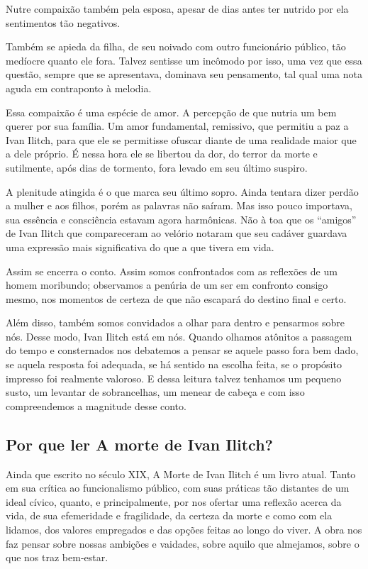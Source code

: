 \documentclass{extarticle}
\begin{document}
Nutre compaixão também pela esposa, apesar de dias antes ter nutrido por
ela sentimentos tão negativos.

Também se apieda da filha, de seu noivado com outro funcionário público,
tão medíocre quanto ele fora. Talvez sentisse um incômodo por isso, uma
vez que essa questão, sempre que se apresentava, dominava seu
pensamento, tal qual uma nota aguda em contraponto à melodia.

Essa compaixão é uma espécie de amor. A percepção de que nutria um bem
querer por sua família. Um amor fundamental, remissivo, que permitiu a
paz a Ivan Ilitch, para que ele se permitisse ofuscar diante de uma
realidade maior que a dele próprio. É nessa hora ele se libertou da dor,
do terror da morte e sutilmente, após dias de tormento, fora levado em
seu último suspiro.

A plenitude atingida é o que marca seu último sopro. Ainda tentara dizer
perdão a mulher e aos filhos, porém as palavras não saíram. Mas isso
pouco importava, sua essência e consciência estavam agora harmônicas.
Não à toa que os ``amigos'' de Ivan Ilitch que compareceram ao velório
notaram que seu cadáver guardava uma expressão mais significativa do que
a que tivera em vida.

Assim se encerra o conto. Assim somos confrontados com as reflexões de
um homem moribundo; observamos a penúria de um ser em confronto consigo
mesmo, nos momentos de certeza de que não escapará do destino final e
certo.

Além disso, também somos convidados a olhar para dentro e pensarmos
sobre nós. Desse modo, Ivan Ilitch está em nós. Quando olhamos atônitos
a passagem do tempo e consternados nos debatemos a pensar se aquele
passo fora bem dado, se aquela resposta foi adequada, se há sentido na
escolha feita, se o propósito impresso foi realmente valoroso. E dessa
leitura talvez tenhamos um pequeno susto, um levantar de sobrancelhas,
um menear de cabeça e com isso compreendemos a magnitude desse conto.

\subsection{Por que ler A morte de Ivan Ilitch?}

Ainda que escrito no século XIX, A Morte de Ivan Ilitch é um livro
atual. Tanto em sua crítica ao funcionalismo público, com suas práticas
tão distantes de um ideal cívico, quanto, e principalmente, por nos
ofertar uma reflexão acerca da vida, de sua efemeridade e fragilidade,
da certeza da morte e como com ela lidamos, dos valores empregados e das
opções feitas ao longo do viver. A obra nos faz pensar sobre nossas
ambições e vaidades, sobre aquilo que almejamos, sobre o que nos traz
bem-estar.
\end{document}
